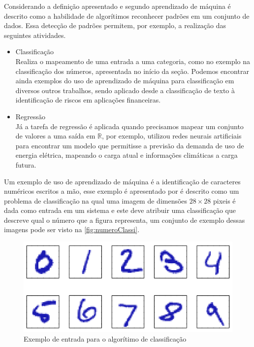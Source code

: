 \documentclass[
    12pt,
    oneside,
    a4paper,
    english,
    brazil
]{abntex2}
\begin{document}
Considerando  a definição  apresentado  e segundo  
aprendizado de máquina  é descrito como a habilidade  de algorítimos reconhecer
padrões  em um  conjunto  de  dados. Essa  detecção  de  padrões permitem,  por
exemplo, a realização das seguintes atividades.
\begin{itemize}
    \item Classificação\\
        Realiza  o  mapeamento  de  uma   entrada  a  uma  categoria,  como  no
        exemplo  na  classificação  dos   números,  apresentada  no  início  da
        seção.  Podemos   encontrar  ainda  exemplos  do   uso  de  aprendizado
        de  máquina  para  classificação  em diversos  outros  trabalhos, sendo
        aplicado desde a classificação de texto à identificação de riscos em
        aplicações financeiras.
    \item Regressão\\
        Já  a  tarefa de  regressão  é  aplicada  quando precisamos  mapear  um
        conjunto  de valores  a  uma  saída em  $  \mathbb{R}  $, por  exemplo,
           utilizou   redes  neurais   artificiais   para
        encontrar um  modelo que  permitisse a  previsão da  demanda de  uso de
        energia elétrica,  mapeando o  carga atual  e informações  climáticas a
        carga futura.
\end{itemize}

Um  exemplo   de  uso  de   aprendizado  de   máquina  é  a   identificação  de
caracteres  numéricos   escritos  a  mão,   esse  exemplo  é   apresentado  por
 é  descrito como  um problema de  classificação na
qual uma imagem  de dimensões $28 \times  28$ pixeis é dada como  entrada em um
sistema e este deve atribuir uma classificação que descreve qual o número que a
figura representa,  um conjunto  de exemplo  dessas imagens  pode ser  visto na
\autoref{fig:numeroClassi}.

\begin{figure}
    \centering
    \caption{Exemplo de entrada para o algorítimo de
        classificação}\label{fig:numeroClassi}
    \includegraphics[width=.5\linewidth]{images/numeroClassificacao.png}
\end{figure}
\end{document}
